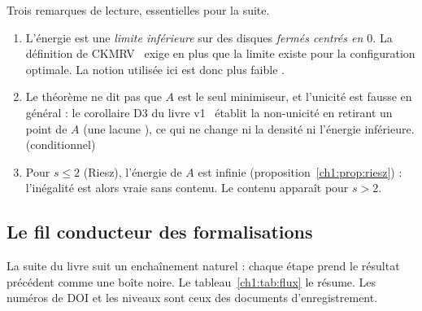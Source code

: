 Trois remarques de lecture, essentielles pour la suite.
\begin{enumerate}
\item L'énergie est une \emph{limite inférieure} sur des disques \emph{fermés centrés en $0$}. La définition de CKMRV~\cite{ckmrv} exige en plus que la limite existe pour la
configuration optimale. La notion utilisée ici est donc plus faible \tierC{}.
\item Le théorème ne dit pas que $A$ est le seul minimiseur, et l'unicité est fausse en général : le corollaire D3 du livre v1~\cite{v1} établit la
non-unicité en retirant un point de $A$ (une \og lacune \fg{}), ce qui ne change ni la densité ni l'énergie inférieure. \tierA{} (conditionnel)
\item Pour $s\le2$ (Riesz), l'énergie de $A$ est infinie (proposition~\ref{ch1:prop:riesz}) : l'inégalité est alors vraie sans contenu. Le contenu apparaît pour $s>2$.
\end{enumerate}

\subsection{Le fil conducteur des formalisations}

La suite du livre suit un enchaînement naturel : chaque étape prend le résultat précédent comme une boîte noire.
Le tableau~\ref{ch1:tab:flux} le résume. Les numéros de DOI et les niveaux sont ceux des documents d'enregistrement.

